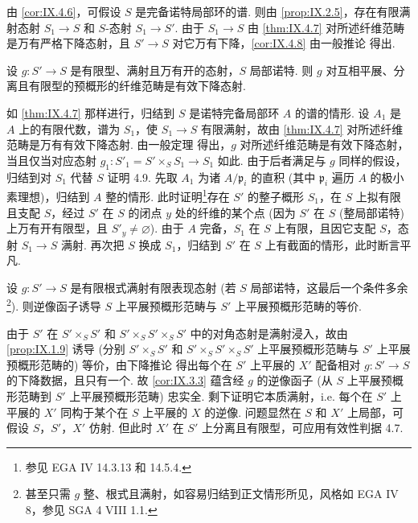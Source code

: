 由 \ref{cor:IX.4.6}，可假设 $S$ 是完备诺特局部环的谱. 则由 \ref{prop:IX.2.5}，存在有限满射态射 $S_1 \to S$ 和 $S$-态射 $S_1 \to S'$. 由于 $S_1 \to S$ 由 \ref{thm:IX.4.7} 对所述纤维范畴是万有严格下降态射，且 $S' \to S$ 对它万有下降，\ref{cor:IX.4.8} 由一般推论 \cite{exp09-D} 得出.

\begin{corollary}\label{cor:IX.4.9}
设 $g \colon S' \to S$ 是有限型、满射且万有开的态射，$S$ 局部诺特. 则 $g$ 对互相平展、分离且有限型的预概形的纤维范畴是有效下降态射.
\end{corollary}

如 \ref{thm:IX.4.7} 那样进行，归结到 $S$ 是诺特完备局部环 $A$ 的谱的情形. 设 $A_1$ 是 $A$ 上的有限代数，谱为 $S_1$，使 $S_1 \to S$ 有限满射，故由 \ref{thm:IX.4.7} 对所述纤维范畴是万有有效下降态射. 由一般定理 \cite{exp09-D} 得出，$g$ 对所述纤维范畴是有效下降态射，当且仅当对应态射 $g_1 \colon S'_1 = S' \times_S S_1 \to S_1$ 如此. 由于后者满足与 $g$ 同样的假设，归结到对 $S_1$ 代替 $S$ 证明 4.9. 先取 $A_1$ 为诸 $A/\mathfrak{p}_i$ 的直积 (其中 $\mathfrak{p}_i$ 遍历 $A$ 的极小素理想)，归结到 $A$ 整的情形. 此时证明\footnote{参见 EGA IV 14.3.13 和 14.5.4.}存在 $S'$ 的整子概形 $S_1$，在 $S$ 上拟有限且支配 $S$，经过 $S'$ 在 $S$ 的闭点 $y$ 处的纤维的某个点 (因为 $S'$ 在 $S$ (整局部诺特) 上万有开有限型，且 $S'_y \neq \varnothing$). 由于 $A$ 完备，$S_1$ 在 $S$ 上有限，且因它支配 $S$，态射 $S_1 \to S$ 满射. 再次把 $S$ 换成 $S_1$，归结到 $S'$ 在 $S$ 上有截面的情形，此时断言平凡.

\begin{theorem}\label{thm:IX.4.10}
设 $g \colon S' \to S$ 是有限根式满射有限表现态射 (若 $S$ 局部诺特，这最后一个条件多余\footnote{甚至只需 $g$ 整、根式且满射，如容易归结到正文情形所见，风格如 EGA IV 8，参见 SGA 4 VIII 1.1.}). 则逆像函子诱导 $S$ 上平展预概形范畴与 $S'$ 上平展预概形范畴的等价.
\end{theorem}

由于 $S'$ 在 $S' \times_S S'$ 和 $S' \times_S S' \times_S S'$ 中的对角态射是满射浸入，故由 \ref{prop:IX.1.9} 诱导 (分别 $S' \times_S S'$ 和 $S' \times_S S' \times_S S'$ 上平展预概形范畴与 $S'$ 上平展预概形范畴的) 等价，由下降推论 \cite{exp09-D} 得出每个在 $S'$ 上平展的 $X'$ 配备相对 $g \colon S' \to S$ 的下降数据，且只有一个. 故 \ref{cor:IX.3.3} 蕴含经 $g$ 的逆像函子 (从 $S$ 上平展预概形范畴到 $S'$ 上平展预概形范畴) 忠实全. 剩下证明它本质满射，i.e. 每个在 $S'$ 上平展的 $X'$ 同构于某个在 $S$ 上平展的 $X$ 的逆像. 问题显然在 $S$ 和 $X'$ 上局部，可假设 $S$，$S'$，$X'$ 仿射. 但此时 $X'$ 在 $S'$ 上分离且有限型，可应用有效性判据 4.7.

